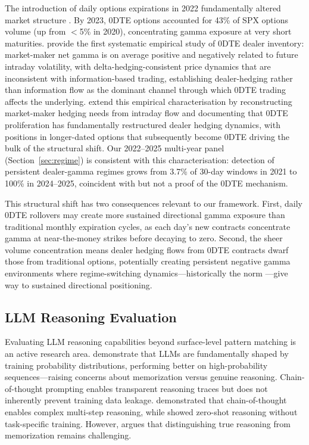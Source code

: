 The introduction of daily options expirations in 2022 fundamentally altered market structure \citep{cboe2024zero}. By 2023, 0DTE options accounted for 43\% of SPX options volume (up from $<$5\% in 2020), concentrating gamma exposure at very short maturities. \citet{dim2023odtes} provide the first systematic empirical study of 0DTE dealer inventory: market-maker net gamma is on average positive and negatively related to future intraday volatility, with delta-hedging-consistent price dynamics that are inconsistent with information-based trading, establishing dealer-hedging rather than information flow as the dominant channel through which 0DTE trading affects the underlying. \citet{adams2025zerodte} extend this empirical characterisation by reconstructing market-maker hedging needs from intraday flow and documenting that 0DTE proliferation has fundamentally restructured dealer hedging dynamics, with positions in longer-dated options that subsequently become 0DTE driving the bulk of the structural shift. Our 2022--2025 multi-year panel (Section~\ref{sec:regime}) is consistent with this characterisation: detection of persistent dealer-gamma regimes grows from 3.7\% of 30-day windows in 2021 to 100\% in 2024--2025, coincident with but not a proof of the 0DTE mechanism.

This structural shift has two consequences relevant to our framework. First, daily 0DTE rollovers may create more sustained directional gamma exposure than traditional monthly expiration cycles, as each day's new contracts concentrate gamma at near-the-money strikes before decaying to zero. Second, the sheer volume concentration means dealer hedging flows from 0DTE contracts dwarf those from traditional options, potentially creating persistent negative gamma environments where regime-switching dynamics---historically the norm \citep{ni2005stock}---give way to sustained directional positioning.

\subsection{LLM Reasoning Evaluation}

Evaluating LLM reasoning capabilities beyond surface-level pattern matching is an active research area. \citet{mccoy2023embers} demonstrate that LLMs are fundamentally shaped by training probability distributions, performing better on high-probability sequences---raising concerns about memorization versus genuine reasoning. Chain-of-thought prompting \citep{openai2024reasoning} enables transparent reasoning traces but does not inherently prevent training data leakage. \citet{wei2022chain} demonstrated that chain-of-thought enables complex multi-step reasoning, while \citet{kojima2022large} showed zero-shot reasoning without task-specific training. However, \citet{marcus2019rebooting} argues that distinguishing true reasoning from memorization remains challenging.

